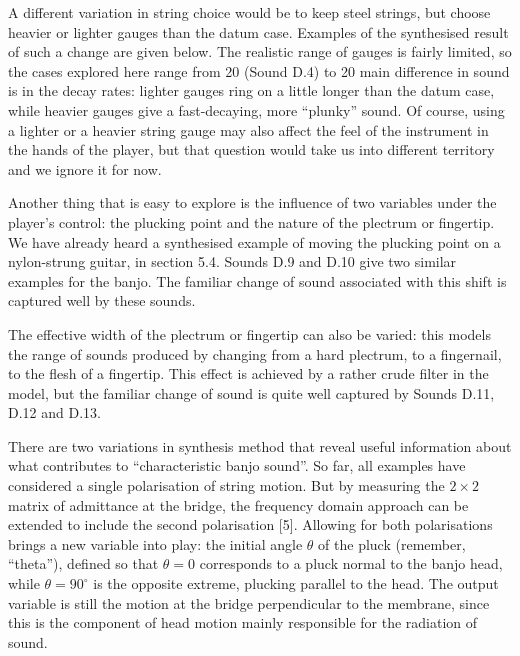   A different variation in string choice would be to keep steel strings, but 
  choose heavier or lighter gauges than the datum case. Examples of the 
  synthesised result of such a change are given below. The realistic range of 
  gauges is fairly limited, so the cases explored here range from 20%
  (Sound D.4) to 20%
  main difference in sound is in the decay rates: lighter gauges ring on a 
  little longer than the datum case, while heavier gauges give a fast-decaying, 
  more ``plunky'' sound. Of course, using a lighter or a heavier string gauge 
  may also affect the feel of the instrument in the hands of the player, but 
  that question would take us into different territory and we ignore it for 
  now. 

  Another thing that is easy to explore is the influence of two variables under 
  the player's control: the plucking point and the nature of the plectrum or 
  fingertip. We have already heard a synthesised example of moving the plucking 
  point on a nylon-strung guitar, in section 5.4. Sounds D.9 and D.10 give two 
  similar examples for the banjo. The familiar change of sound associated with 
  this shift is captured well by these sounds. 

  The effective width of the plectrum or fingertip can also be varied: this 
  models the range of sounds produced by changing from a hard plectrum, to a 
  fingernail, to the flesh of a fingertip. This effect is achieved by a rather 
  crude filter in the model, but the familiar change of sound is quite well 
  captured by Sounds D.11, D.12 and D.13. 


  There are two variations in synthesis method that reveal useful information 
  about what contributes to ``characteristic banjo sound''. So far, all 
  examples have considered a single polarisation of string motion. But by 
  measuring the $2 \times 2$ matrix of admittance at the bridge, the frequency 
  domain approach can be extended to include the second polarisation [5]. 
  Allowing for both polarisations brings a new variable into play: the initial 
  angle $\theta$ of the pluck (remember, ``theta''), defined so that $\theta = 
  0$ corresponds to a pluck normal to the banjo head, while $\theta = 90^\circ$ 
  is the opposite extreme, plucking parallel to the head. The output variable 
  is still the motion at the bridge perpendicular to the membrane, since this 
  is the component of head motion mainly responsible for the radiation of 
  sound. 

